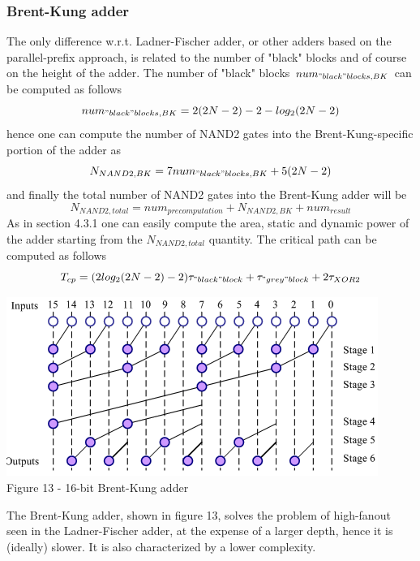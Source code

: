 \documentclass[11pt]{article} %
\begin{document}
\subsubsection{Brent-Kung adder}
The only difference w.r.t. Ladner-Fischer adder, or other adders based on the parallel-prefix approach, is related to the number of "black" blocks and of course on the height of the adder. The number of "black" blocks $ num_{"black"blocks,BK} $ can be computed as follows
$$ num_{"black"blocks,BK} = 2(2N-2)-2-log_2 (2N-2)$$
hence one can compute the number of NAND2 gates into the Brent-Kung-specific portion of the adder as
$$ N_{NAND2,BK} = 7 num_{"black"blocks,BK}  + 5 (2N-2)$$
and finally the total number of NAND2 gates into the Brent-Kung adder will be 
$$ N_{NAND2,total} = num_{precomputation} + N_{NAND2,BK} + num_{result} $$
As in section 4.3.1 one can easily compute the area, static and dynamic power of the adder starting from the $ N_{NAND2,total}$ quantity.
The critical path can be computed as follows
$$ T_{cp} = (2log_2(2N-2)-2) \tau_{"black"block} + \tau_{"grey"block} + 2 \tau_{XOR2}$$
\vspace{1em}
\begin{center}
\includegraphics[scale=.80]{brent.PNG}\\
\small{Figure 13 - 16-bit Brent-Kung adder}
\end{center}
\vspace{1em}
The Brent-Kung adder, shown in figure 13, solves the problem of high-fanout seen in the Ladner-Fischer adder, at the expense of a larger depth, hence it is (ideally) slower. It is also characterized by a lower complexity.
\vspace{2em}
\end{document}
